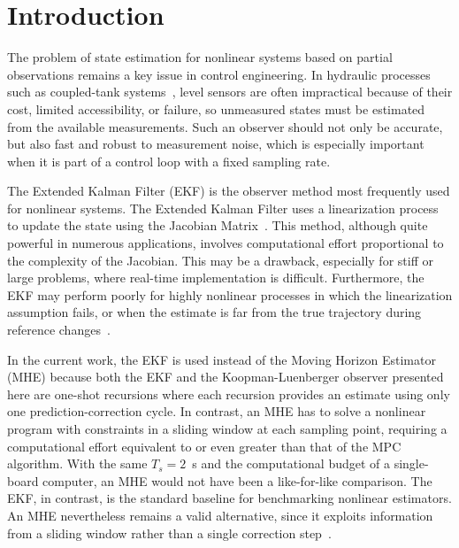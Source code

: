 \documentclass[asi,article,accept,pdftex,moreauthors]{Definitions/mdpi}
\begin{document}
\section{Introduction}\label{sec:intro}

The problem of state estimation for nonlinear systems based on partial observations remains a key issue in control engineering. In hydraulic processes such as coupled-tank systems~\cite{johansson2000}, level sensors are often impractical because of their cost, limited accessibility, or failure, so unmeasured states must be estimated from the available measurements. Such an observer should not only be accurate, but also fast and robust to measurement noise, which is especially important when it is part of a control loop with a fixed sampling rate.

The Extended Kalman Filter (EKF) is the observer method most frequently used for nonlinear systems. The Extended Kalman Filter uses a linearization process to update the state using the Jacobian Matrix~\cite{simon2006}. This method, although quite powerful in numerous applications, involves computational effort proportional to the complexity of the Jacobian. This may be a drawback, especially for stiff or large problems, where real-time implementation is difficult. Furthermore, the EKF may perform poorly for highly nonlinear processes in which the linearization assumption fails, or when the estimate is far from the true trajectory during reference changes~\cite{julier2004}.

In the current work, the EKF is used instead of the Moving Horizon Estimator (MHE) because both the EKF and the Koopman-Luenberger observer presented here are one-shot recursions where each recursion provides an estimate using only one prediction-correction cycle. In contrast, an MHE has to solve a nonlinear program with constraints in a sliding window at each sampling point, requiring a computational effort equivalent to or even greater than that of the MPC algorithm. With the same $T_s = 2$~s and the computational budget of a single-board computer, an MHE would not have been a like-for-like comparison. The EKF, in contrast, is the standard baseline for benchmarking nonlinear estimators. An MHE nevertheless remains a valid alternative, since it exploits information from a sliding window rather than a single correction step~\cite{rao2003}.
\end{document}
